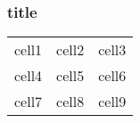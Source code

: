 \documentclass{beamer}
\begin{document}
\begin{frame}[t] \frametitle{title}
    \begin{block}{}
        \begin{tabular}{ccc}
         cell1 & cell2 & cell3 \\ 
         cell4 & cell5 & cell6 \\  
         cell7 & cell8 & cell9    
        \end{tabular}
    \end{block}
\end{frame}
\end{document}
